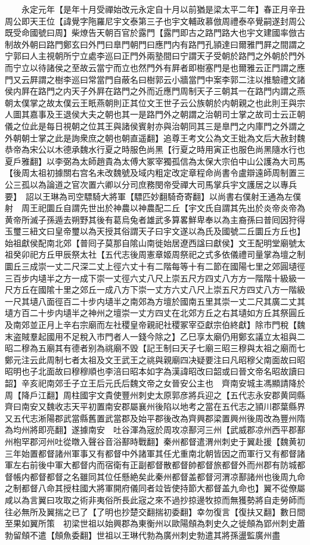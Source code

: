 　　永定元年【是年十月受禪始改元永定自十月以前猶是梁太平二年】春正月辛丑周公即天王位【諱覺字陁羅尼宇文泰第三子也宇文輔政慕倣周禮泰卒覺嗣遂封周公既受命國號曰周】柴燎告天朝百官於露門【露門即古之路門路大也宇文建國率倣古制故外朝曰路門鄭玄曰外門曰臯門朝門曰應門内有路門孔頴達曰爾雅門屛之間謂之宁郭曰人主視朝所宁立處李巡曰正門外兩塾間曰宁謂天子受朝於路門之外朝於門外而宁立以待諸侯之至故云當宁而立也然門外有屛者即樹塞門是也爾雅云正門謂之應門又云屛謂之樹李巡曰常當門自蔽名曰樹郭云小牆當門中案李郭二注以推驗禮文諸侯内屛在路門之内天子外屛在路門之外而近應門周制天子三朝其一在路門内謂之燕朝太僕掌之故太僕云王眂燕朝則正其位文王世子云公族朝於内朝親之也此則王與宗人圖其嘉事及王退侯大夫之朝也其一是路門外之朝謂之治朝司士掌之故司士云正朝儀之位此是每日視朝之位其王與諸侯賓射亦與治朝同其三是臯門之内庫門之外謂之外朝朝士掌之此是詢衆庶之朝也朝直遥翻】追尊王考文公為文王妣為文后大赦封魏恭帝為宋公以木德承魏水行夏之時服色尚黑【行夏之時用寅正也服色尚黑隨水行也夏戶雅翻】以李弼為太師趙貴為太傅大冢宰獨孤信為太保大宗伯中山公護為大司馬【後周太祖初據關右宫名未改魏號及域内粗定改定章程命尚書令盧辯遠師周制置三公三孤以為論道之官次置六卿以分司庶務閔帝受禪大司馬掌兵宇文護居之以專兵要】　詔以王琳為司空驃騎大將軍【驃匹妙翻騎奇寄翻】以尚書右僕射王通為左僕射　周王祀圜丘自謂先世出於神農以神農配二丘【宇文氏自謂其先出於炎帝炎帝為黄帝所滅子孫遁去朔野其後有葛烏兔者雄武多算畧鮮卑奉以為主裔孫曰普囘因狩得玉璽三紐文曰皇帝璽以為天授其俗謂天子曰宇文遂以為氏及國號二丘圜丘方丘也】始祖獻侯配南北郊【普囘子莫那自隂山南徙始居遼西諡曰獻侯】文王配明堂廟號太祖癸卯祀方丘甲辰祭太社【五代志後周憲章姬周祭祀之式多依儀禮司量掌為壇之制圜丘三成崇一丈二尺深二丈上徑六丈十有二階每等十有二節在國陽七里之郊圓壝徑三百步内壝半之方一成下崇一丈徑六丈八尺上崇五尺方四丈八方方一階階十級級一尺方丘在國隂十里之郊丘一成八方下崇一丈方六丈八尺上崇五尺方四丈八方一階級一尺其壝八面徑百二十步内壝半之南郊為方壇於國南五里其崇一丈二尺其廣二丈其壝方百二十步内壝半之神州之壇崇一丈方四丈在北郊方丘之右其壝如方丘其祭圓丘及南郊並正月上辛右宗廟而左社稷皇帝親祀社稷冢宰亞獻宗伯終獻】除市門稅【魏末盗賊羣起國用不足稅入市門者人一錢今除之】乙巳享太廟仍用鄭玄議立太祖與二昭二穆為五廟其有德者别為祧廟不毁【記王制曰天子七廟三昭三穆與太祖之廟而七鄭元注云此周制七者太祖及文王武王之祧與親廟四决疑要注曰凡昭穆父南面故曰昭昭明也子北面故曰穆穆順也李涪曰昭本如字為漢諱昭改曰韶或曰晉文帝名昭故讀曰韶】辛亥祀南郊壬子立王后元氏后魏文帝之女晉安公主也　齊南安城主馮顯請降於周【降戶江翻】周柱國宇文貴使豐州刺史太原郭彦將兵迎之【五代志永安郡黄岡縣齊曰南安又魏收志天平初置南安郡屬襄州後陷以地考之當在五代志之頴川郡葉縣界又五代志淅陽郡武當縣舊置武當郡及始平郡後改為齊興郡梁置興州後周改為豐州隋為均州將即亮翻】遂據南安　吐谷渾為宼於周攻凉鄯河三州【武威郡凉州西平郡鄯州枹罕郡河州吐從暾入聲谷音浴鄯時戰翻】秦州都督遣渭州刺史于翼赴援【魏黄初三年始置都督諸州軍事又有都督中外諸軍其任尤重南北朝皆因之而軍行又有都督諸軍左右前後中軍大都督内而宿衛有正副都督散都督帥都督旅都督外而州郡有防城都督帳内都督都督之名雖同其位任懸絶矣此秦州都督盖都督河渭凉鄯諸州也後周九命之制都督八命其授柱國大將軍開府儀同者竝皆使持節大都督盖九命也】翼不從僚屬咸以為言翼曰攻取之術非夷俗所長此宼之來不過抄掠邊牧掠而無獲勢將自走勞師而往必無所及翼揣之已了【了明也抄楚交翻揣初委翻】幸勿復言【復扶又翻】數日間至果如翼所策　初梁世祖以始興郡為東衡州以歐陽頠為刺史久之徙頠為郢州刺史蕭勃留頠不遣【頠魚委翻】世祖以王琳代勃為廣州刺史勃遣其將孫盪監廣州盡